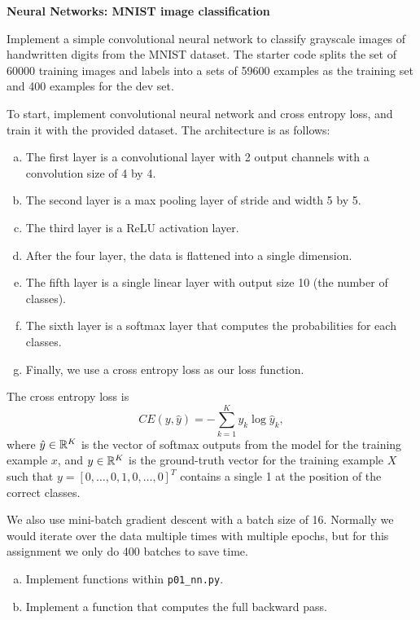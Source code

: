 \documentclass[12pt,letterpaper,boxed]{hmcpset}
\begin{document}

\begin{problem}[Problem 1]
\textbf{Neural Networks: MNIST image classification}

Implement a simple convolutional neural network to classify grayscale images of handwritten digits from the MNIST dataset. The starter code splits the set of 60000 training images and labels into a sets of 59600 examples as the training set and 400 examples for the dev set.

To start, implement convolutional neural network and cross entropy loss, and train it with the provided dataset. The architecture is as follows:
\begin{enumerate}[(a)]
  \item The first layer is a convolutional layer with 2 output channels with a convolution size of 4 by 4.
  \item The second layer is a max pooling layer of stride and width 5 by 5.
  \item The third layer is a ReLU activation layer.
  \item After the four layer, the data is flattened into a single dimension.
  \item The fifth layer is a single linear layer with output size 10 (the number of classes).
  \item The sixth layer is a softmax layer that computes the probabilities for each classes.
  \item Finally, we use a cross entropy loss as our loss function.
\end{enumerate}

The cross entropy loss is
\[
CE(y, \hat y) = - \sum_{k=1}^K y_k \log \hat{y}_k,
\]
where $\hat y \in \mathbb{R}^K$ is the vector of softmax outputs from the model for the training example $x$, and $y \in \mathbb{R}^K$ is the ground-truth vector for the training example $X$ such that $y = [0, \dots, 0, 1, 0, \dots, 0]^T$ contains a single 1 at the position of the correct classes.

We also use mini-batch gradient descent with a batch size of 16. Normally we would iterate over the data multiple times with multiple epochs, but for this assignment we only do 400 batches to save time.
\end{problem}

\begin{solution}
\begin{enumerate}[(a)]
  \item Implement functions within \verb|p01_nn.py|.
  \item Implement a function that computes the full backward pass.
\end{enumerate}
\end{solution}
\end{document}
